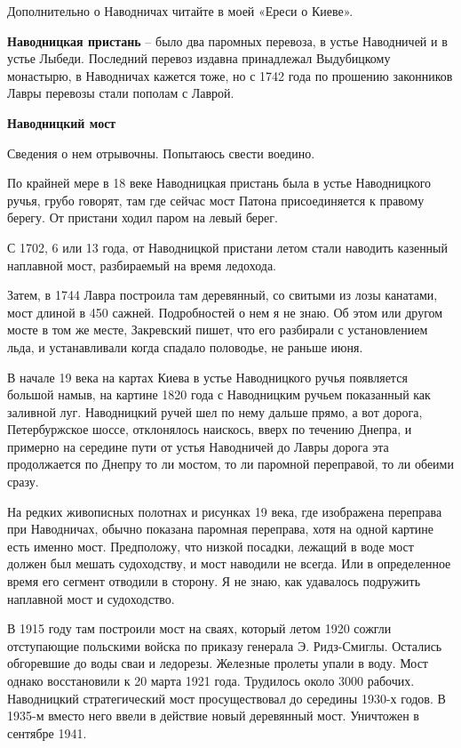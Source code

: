 Дополнительно о Наводничах читайте в моей «Ереси о Киеве».\\

\medskip

\textbf{Наводницкая пристань} – было два паромных перевоза, в устье Наводничей и в устье Лыбеди. Последний перевоз издавна принадлежал Выдубицкому монастырю, в Наводничах кажется тоже, но с 1742 года по прошению законников Лавры перевозы стали пополам с Лаврой.\\

\medskip

\textbf{Наводницкий мост} 

Сведения о нем отрывочны. Попытаюсь свести воедино.

По крайней мере в 18 веке Наводницкая пристань была в устье Наводницкого ручья, грубо говорят, там где сейчас мост Патона присоединяется к правому берегу. От пристани ходил паром на левый берег.

С 1702, 6 или 13 года, от Наводницкой пристани летом стали наводить казенный наплавной мост, разбираемый на время ледохода. 

Затем, в 1744 Лавра построила там деревянный, со свитыми из лозы канатами, мост длиной в 450 сажней. Подробностей о нем я не знаю. Об этом или другом мосте в том же месте, Закревский пишет, что его разбирали с установлением льда, и устанавливали когда спадало половодье, не раньше июня.

В начале 19 века на картах Киева в устье Наводницкого ручья появляется большой намыв, на картине 1820 года с Наводницким ручьем показанный как заливной луг. Наводницкий ручей шел по нему дальше прямо, а вот дорога, Петербуржское шоссе, отклонялось наискось, вверх по течению Днепра, и примерно на середине пути от устья Наводничей до Лавры дорога эта продолжается по Днепру то ли мостом, то ли паромной переправой, то ли обеими сразу.

На редких живописных полотнах и рисунках 19 века, где изображена переправа при Наводничах, обычно показана паромная переправа, хотя на одной картине есть именно мост. Предположу, что низкой посадки, лежащий в воде мост должен был мешать судоходству, и мост наводили не всегда. Или в определенное время его сегмент отводили в сторону. Я не знаю, как удавалось подружить наплавной мост и судоходство.

В 1915 году там построили мост на сваях, который летом 1920 сожгли отступающие польскими войска по приказу генерала Э. Ридз-Смиглы. Остались обгоревшие до воды сваи и ледорезы. Железные пролеты упали в воду. Мост однако восстановили к 20 марта 1921 года. Трудилось около 3000 рабочих. 
Наводницкий стратегический мост просуществовал до середины 1930-х годов. В 1935-м вместо него ввели в действие новый деревянный мост. Уничтожен в сентябре 1941.\\


